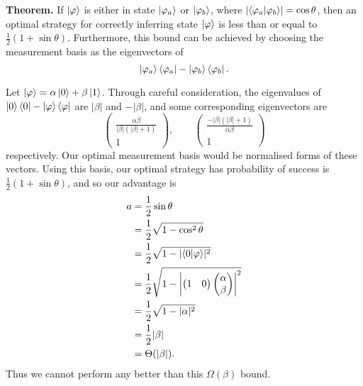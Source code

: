 \begin{parts}
\begin{solution}
        \textbf{Theorem.} If $\ket{\varphi}$ is either in state $\ket{\varphi_a}$ or $\ket{\varphi_b}$, where $\lvert \braket{\varphi_a | \varphi_b} \rvert = \cos\theta$, then an optimal strategy for correctly inferring state $\ket\varphi$ is less than or equal to $\frac12(1 + \sin\theta)$. Furthermore, this bound can be achieved by choosing the measurement basis as the eigenvectors of
        \[ \ket{\varphi_a}\bra{\varphi_a} - \ket{\varphi_b}\bra{\varphi_b}. \]

        Let $\ket\varphi = \alpha\ket0 + \beta\ket 1$. Through careful consideration, the eigenvalues of $\ket{0}\bra{0} - \ket\varphi\bra\varphi$ are $\lvert\beta\rvert$ and $-\lvert\beta\rvert$, and some corresponding eigenvectors are
        \[
            \begin{pmatrix}
                \frac{\alpha\overline\beta}{\lvert\beta\rvert(\lvert \beta \rvert + 1)} \\
                1
            \end{pmatrix},
            \qquad
            \begin{pmatrix}
                \frac{-\lvert\beta\rvert(\lvert \beta \rvert + 1)}{\overline\alpha\beta} \\
                1
            \end{pmatrix}
        \]
        respectively. Our optimal measurement basis would be normalised forms of these vectors. Using this basis, our optimal strategy has probability of success is $\frac12(1+\sin\theta)$, and so our advantage is
        \begin{align*}
            a
             & = \frac12\sin\theta                                    \\
             & = \frac12\sqrt{1 - \cos^2\theta}                       \\
             & = \frac12\sqrt{1 - \lvert \braket{0|\varphi} \rvert^2} \\
             & = \frac12\sqrt{1 - \left\lvert
                \begin{pmatrix}
                    1 & 0
                \end{pmatrix}
                \begin{pmatrix}
                    \alpha \\ \beta
                \end{pmatrix}
            \right\rvert^2}                                           \\
             & = \frac12 \sqrt{1 - \lvert \alpha \rvert^2}            \\
             & = \frac12 \lvert \beta \rvert                          \\
             & = \Theta(\lvert\beta\rvert).
        \end{align*}
        Thus we cannot perform any better than this $\Omega(\beta)$ bound.
    \end{solution}
\end{parts}